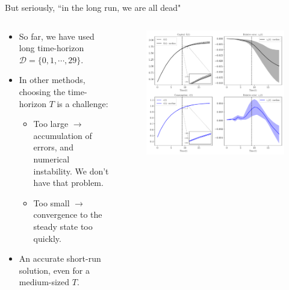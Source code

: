 \documentclass[aspectratio=169,10pt]{beamer}
\begin{document}
\begin{frame}{But seriously, ``in the long run, we are all dead"}

	\begin{columns}
	\begin{column}{0.5\textwidth}
		\begin{itemize}
			\item So far, we have used long time-horizon $\mathcal{D} = \{0,1,\cdots,29\}$.
			\vspace{0.05in}
			\item In other methods, choosing the time-horizon $T$ is a challenge:
			\begin{itemize}
					\item Too large $\rightarrow$ accumulation of errors, and numerical instability. We don't have that problem.
				\item Too small $\rightarrow$ convergence to the steady state too quickly.
			\end{itemize}
			 \vspace{0.05in}
			\item An accurate short-run solution, even for a medium-sized $T$.
		\end{itemize}
	\end{column}
	\begin{column}{0.5\textwidth}
		\begin{figure}[t!]
			\centering
			\includegraphics[width=\textwidth]{figs/growth_sequential_g0_t_max_9_ensemble.pdf}
			\vspace{-7mm}
		\end{figure}
	\end{column}
\end{columns}
\end{frame}
\end{document}

